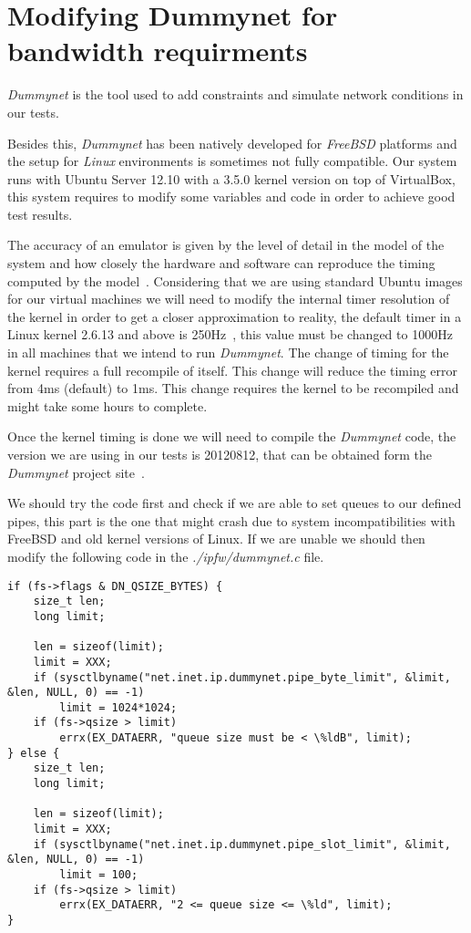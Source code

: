 \section{Modifying Dummynet for bandwidth requirments}
\label{sec:dummynet}

\thispagestyle{empty}

{\it Dummynet} is the tool used to add constraints and simulate network conditions in our tests. 

Besides this, {\it Dummynet} has been natively developed for {\it FreeBSD} platforms and the setup for {\it Linux} environments is sometimes not fully compatible. Our system runs with Ubuntu Server 12.10 with a 3.5.0 kernel version on top of VirtualBox, this system requires to modify some variables and code in order to achieve good test results.

The accuracy of an emulator is given by the level of detail in the model of the system and how closely the hardware and software can reproduce the timing computed by the model~\cite{dummynetRevisited}. Considering that we are using standard Ubuntu images for our virtual machines we will need to modify the internal timer resolution of the kernel in order to get a closer approximation to reality, the default timer in a Linux kernel  2.6.13 and above is 250Hz~\cite{linuxKernelTime}, this value must be changed to 1000Hz in all machines that we intend to run {\it Dummynet}. The change of timing for the kernel requires a full recompile of itself. This change will reduce the timing error from 4ms (default) to 1ms. This change requires the kernel to be recompiled and might take some hours to complete.

Once the kernel timing is done we will need to compile the {\it Dummynet} code, the version we are using in our tests is 20120812, that can be obtained form the {\it Dummynet} project site~\cite{dummynetTool}.

We should try the code first and check if we are able to set queues to our defined pipes, this part is the one that might crash due to system incompatibilities with FreeBSD and old kernel versions of Linux.  If we are unable we should then modify the following code in the {\it ./ipfw/dummynet.c} file.

\begin{lstlisting}
if (fs->flags & DN_QSIZE_BYTES) {
	size_t len;
	long limit;

	len = sizeof(limit);
	limit = XXX;
	if (sysctlbyname("net.inet.ip.dummynet.pipe_byte_limit", &limit, &len, NULL, 0) == -1)
		limit = 1024*1024;
	if (fs->qsize > limit)
		errx(EX_DATAERR, "queue size must be < \%ldB", limit);
} else {
	size_t len;
	long limit;

	len = sizeof(limit);
	limit = XXX;
	if (sysctlbyname("net.inet.ip.dummynet.pipe_slot_limit", &limit, &len, NULL, 0) == -1)
		limit = 100;
	if (fs->qsize > limit)
		errx(EX_DATAERR, "2 <= queue size <= \%ld", limit);
}
\end{lstlisting}

